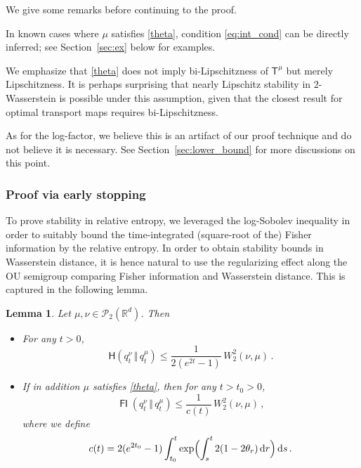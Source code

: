 \documentclass[12pt]{article}
\newcommand{\cP}{\mathcal{P}}
\newcommand{\RR}{\mathbb{R}}
\newcommand{\1}{\mathds{1}}
\newcommand*{\rd}{\mathrm{d}}
\newcommand*{\dd}{\, \rd}
\newcommand{\mmid}{\,\Vert\,}
\DeclareMathOperator*{\FI}{\mathsf{FI}}
\renewcommand{\leq}{\leqslant}
\renewcommand{\le}{\leqslant}
\theoremstyle{plain}
\newtheorem{lemma}[theorem]{Lemma}
\theoremstyle{definition}
\theoremstyle{remark}
\begin{document}
We give some remarks before continuing to the proof.

In known cases where $\mu$ satisfies \eqref{theta}, condition \eqref{eq:int_cond} can be directly inferred; see Section~\ref{sec:ex} below for examples. 

We emphasize that \eqref{theta} does not imply bi-Lipschitzness of $\mathsf T^{\mu}$ but merely Lipschitzness. It is perhaps surprising that nearly Lipschitz stability in $2$-Wasserstein is possible under this assumption, given that the closest result for optimal transport maps requires bi-Lipschitzness.

As for the log-factor, we believe this is an artifact of our proof technique and do not believe it is necessary. See Section~\ref{sec:lower_bound} for more discussions on this point.


\subsubsection{Proof via early stopping}


To prove stability in relative entropy, we leveraged the log-Sobolev inequality in order to suitably bound the time-integrated (square-root of the) Fisher information by the relative entropy. In order to obtain stability bounds in Wasserstein distance, it is hence natural to use the regularizing effect along the OU semigroup comparing Fisher information and Wasserstein distance. This is captured in the following lemma.
\begin{lemma}\label{lem:W2-reg-OU}
Let $\mu, \nu \in \cP_2(\RR^d)$. Then
\begin{itemize}
\item For any $t > 0$,
\begin{equation}\label{eq:H<W2}
    {\mathsf H}(q_{t}^\nu \mmid q_{t}^\mu) \leq \frac{1}{2(e^{2t}-1)}\, W_2^2(\nu,\mu)\,.
\end{equation}
\item If in addition $\mu$ satisfies \eqref{theta}, then for any $t > t_0 > 0$,
\begin{equation}\label{eq:FI<W2}
    {\FI}(q_{t}^\nu\mmid q_{t}^\mu) \le \frac{1}{c(t)}\, W_2^2(\nu,\mu)\,,
\end{equation}
where we define
\begin{align}\label{eq:ct}
    c(t) = 2(e^{2t_0}-1) \int_{t_0}^t \exp\Bigl(\int_s^t 2(1-2\theta_r)\dd r\Bigr)\dd s\,.
\end{align}
\end{itemize}
\end{lemma}
\end{document}

